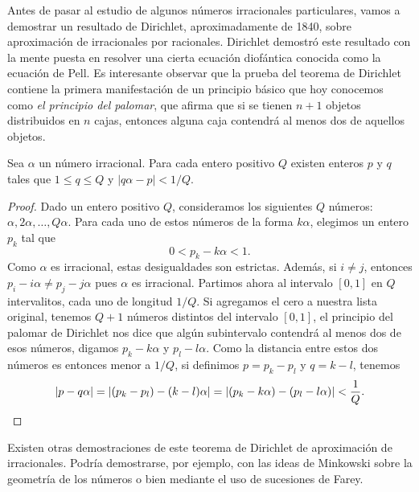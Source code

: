 
Antes de pasar al estudio de algunos números irracionales particulares, vamos a
demostrar un resultado de Dirichlet, aproximadamente de 1840, sobre
aproximación de irracionales por racionales.  Dirichlet demostró este resultado
con la mente puesta en resolver una cierta ecuación diofántica conocida como la
ecuación de Pell. Es interesante observar que la prueba del teorema de
Dirichlet contiene la primera manifestación de un principio básico que hoy
conocemos como \emph{el principio del palomar}, que afirma que si se tienen 
$n+1$ objetos distribuidos en $n$ cajas, entonces alguna caja contendrá al
menos dos de aquellos objetos.

\begin{theorem}[Dirichlet]
	Sea $\alpha$ un número irracional. Para cada entero positivo $Q$ existen
	enteros $p$ y $q$ tales que $1\leq q\leq Q$ y $|q\alpha-p|<1/Q$. 
\end{theorem}

\begin{proof}
	Dado un entero positivo $Q$, consideramos los siguientes $Q$ números:
	$\alpha,2\alpha,\dots,Q\alpha$. Para cada uno de estos números de la
	forma $k\alpha$, elegimos un entero $p_k$ tal que 
	\[
		0<p_k-k\alpha<1.
	\]
	Como $\alpha$ es irracional, estas desigualdades son estrictas. Además, si
	$i\ne j$, entonces $p_i-i\alpha\ne p_j-j\alpha$ pues $\alpha$ es
	irracional. Partimos ahora al intervalo $[0,1]$ en $Q$ intervalitos, cada
	uno de longitud $1/Q$. Si agregamos el cero a nuestra lista original,
	tenemos $Q+1$ números distintos del intervalo $[0,1]$, el principio del
	palomar de Dirichlet nos dice que algún subintervalo contendrá al menos dos
	de esos números, digamos $p_k-k\alpha$ y $p_l-l\alpha$. Como la distancia
	entre estos dos números es entonces menor a $1/Q$, si definimos $p=p_k-p_l$
	y $q=k-l$, tenemos 
	\[
		|p-q\alpha|=|(p_k-p_l)-(k-l)\alpha|=|(p_k-k\alpha)-(p_l-l\alpha)|<\frac1{Q}.\qedhere
	\]
\end{proof}

Existen otras demostraciones de este teorema de Dirichlet de aproximación de
irracionales. Podría demostrarse, por ejemplo, con las ideas de Minkowski sobre
la geometría de los números o bien mediante el uso de sucesiones de Farey.

